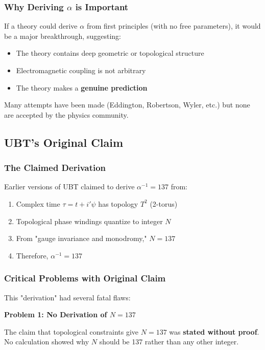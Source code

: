 \subsubsection{Why Deriving $\alpha$ is Important}

If a theory could derive $\alpha$ from first principles (with no free parameters), it would be a major breakthrough, suggesting:
\begin{itemize}
\item The theory contains deep geometric or topological structure
\item Electromagnetic coupling is not arbitrary
\item The theory makes a \textbf{genuine prediction}
\end{itemize}

Many attempts have been made (Eddington, Robertson, Wyler, etc.) but none are accepted by the physics community.

\subsection{UBT's Original Claim}

\subsubsection{The Claimed Derivation}

Earlier versions of UBT claimed to derive $\alpha^{-1} = 137$ from:
\begin{enumerate}
\item Complex time $\tau = t + i'\psi$ has topology $T^2$ (2-torus)
\item Topological phase windings quantize to integer $N$
\item From "gauge invariance and monodromy," $N = 137$
\item Therefore, $\alpha^{-1} = 137$
\end{enumerate}

\subsubsection{Critical Problems with Original Claim}

This "derivation" had several fatal flaws:

\textbf{Problem 1: No Derivation of $N = 137$}

The claim that topological constraints give $N = 137$ was \textbf{stated without proof}. No calculation showed why $N$ should be 137 rather than any other integer.

